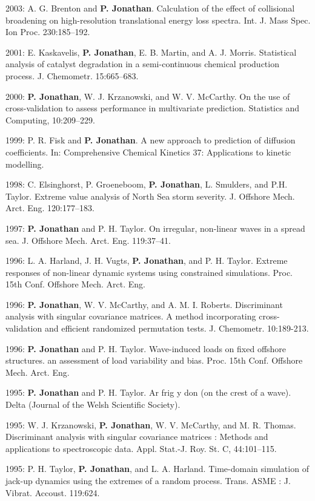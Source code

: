 \documentclass[11pt,a4paper]{moderncv}
\begin{document}
2003: A. G. Brenton and \textbf{P. Jonathan}. Calculation of the effect of collisional broadening on high-resolution translational energy loss spectra. Int. J. Mass Spec. Ion Proc. 230:185--192.

2001: E. Kaskavelis, \textbf{P. Jonathan}, E. B. Martin, and A. J. Morris. Statistical analysis of catalyst degradation in a semi-continuous chemical production process. J. Chemometr. 15:665--683.

2000: \textbf{P. Jonathan}, W. J. Krzanowski, and W. V. McCarthy. On the use of cross-validation to assess performance in multivariate prediction. Statistics and Computing, 10:209--229.

1999: P. R. Fisk and \textbf{P. Jonathan}. A new approach to prediction of diffusion coefficients. In: Comprehensive Chemical Kinetics 37: Applications to kinetic modelling. 

1998: C. Elsinghorst, P. Groeneboom, \textbf{P. Jonathan}, L. Smulders, and P.H. Taylor. Extreme value analysis of North Sea storm severity. J. Offshore Mech. Arct. Eng. 120:177--183.

1997: \textbf{P. Jonathan} and P. H. Taylor. On irregular, non-linear waves in a spread sea. J. Offshore Mech. Arct. Eng. 119:37--41.

1996: L. A. Harland, J. H. Vugts, \textbf{P. Jonathan}, and P. H. Taylor. Extreme responses of non-linear dynamic systems using constrained simulations. Proc. 15th Conf. Offshore Mech. Arct. Eng.

1996: \textbf{P. Jonathan}, W. V. McCarthy, and A. M. I. Roberts. Discriminant analysis with singular covariance matrices. A method incorporating cross-validation and efficient randomized permutation tests. J. Chemometr. 10:189-213.

1996: \textbf{P. Jonathan} and P. H. Taylor. Wave-induced loads on fixed offshore structures. an assessment of load variability and bias. Proc. 15th Conf. Offshore Mech. Arct. Eng.

1995: \textbf{P. Jonathan} and P. H. Taylor. Ar frig y don (on the crest of a wave). Delta (Journal of the Welsh Scientific Society).

1995: W. J. Krzanowski, \textbf{P. Jonathan}, W. V. McCarthy, and M. R. Thomas. Discriminant analysis with singular covariance matrices : Methods and applications to spectroscopic data. Appl. Stat.-J. Roy. St. C, 44:101--115.

1995: P. H. Taylor, \textbf{P. Jonathan}, and L. A. Harland. Time-domain simulation of jack-up dynamics using the extremes of a random process. Trans. ASME : J. Vibrat. Accoust. 119:624.
\end{document}
